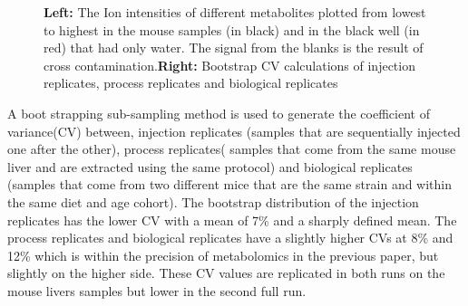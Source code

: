 \documentclass[a4paper,11pt,twoside]{book}
\begin{document}
\begin{figure}[hbt!]
	\caption{\textbf{Left:} The Ion intensities of different metabolites plotted from lowest to highest in the mouse samples (in black) and in the black well (in red) that had only water. The signal from the blanks is the result of cross contamination.\textbf{Right:} Bootstrap CV calculations of injection replicates, process replicates and biological replicates}
	\label{fig:Total Ion Counts}
\end{figure}
	
A boot strapping sub-sampling method is used to generate the coefficient of variance(CV) between, injection replicates (samples that are sequentially injected one after the other), process replicates( samples that come from the same mouse liver and are extracted using the same protocol) and biological replicates (samples that come from two different mice that are the same strain and within the same diet and age cohort). The bootstrap distribution of the injection replicates has the lower CV with a mean of 7\% and a sharply defined mean. The process replicates and biological replicates have a slightly higher CVs at 8\% and 12\% which is within the precision of metabolomics in the previous paper, but slightly on the higher side. These CV values are replicated in both runs on the mouse livers samples but lower in the second full run.
	
\end{document}
